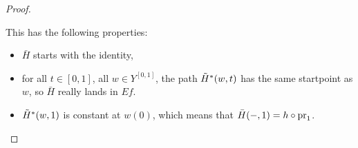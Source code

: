 \begin{proof}
\begin{claimproof}
This has the following properties:
\begin{itemize}[label={-}]
    \item $\bar H$ starts with the identity,
    \item for all $t\in [0,1]$, all $w\in Y^{[0,1]}$, the path $\tilde H^*(w,t)$ has the same startpoint as $w$, so $\bar H$ really lands in $Ef$.
    \item $\tilde H^*(w,1)$ is constant at $w(0)$, which means that $\bar H(-,1)=h\circ\operatorname{pr}_1$.
\end{itemize}
\end{claimproof}
\end{proof}
